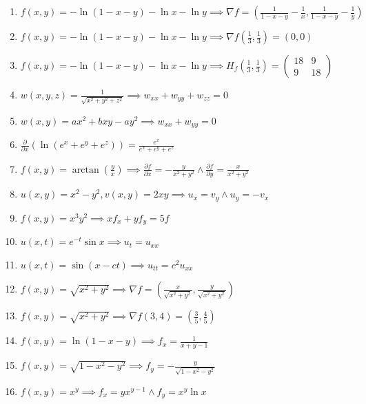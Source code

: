 \documentclass[11pt,a4paper]{article}
\begin{document}
\begin{enumerate}
\item $\displaystyle f(x, y) = -\ln(1 - x - y) - \ln x - \ln y \implies \nabla f = \left( \frac{1}{1 - x - y} - \frac{1}{x}, \frac{1}{1 - x - y} - \frac{1}{y} \right)$
\item $\displaystyle f(x, y) = -\ln(1 - x - y) - \ln x - \ln y \implies \nabla f\left( \frac{1}{3}, \frac{1}{3} \right) = (0, 0)$
\item $\displaystyle f(x, y) = -\ln(1 - x - y) - \ln x - \ln y \implies H_{f}\left( \frac{1}{3}, \frac{1}{3} \right) = \begin{pmatrix} 18 & 9 \\ 9 & 18 \end{pmatrix}$
\item $\displaystyle w(x, y, z) = \frac{1}{\sqrt{x^{2} + y^{2} + z^{2}}} \implies w_{xx} + w_{yy} + w_{zz} = 0$
\item $\displaystyle w(x, y) = ax^{2} + bxy - ay^{2} \implies w_{xx} + w_{yy} = 0$
\item $\displaystyle \frac{\partial}{\partial x}\left( \ln(e^{x} + e^{y} + e^{z}) \right) = \frac{e^{x}}{e^{x} + e^{y} + e^{z}}$
\item $\displaystyle f(x, y) = \arctan\left( \frac{y}{x} \right) \implies \frac{\partial f}{\partial x} = -\frac{y}{x^{2} + y^{2}} \land \frac{\partial f}{\partial y} = \frac{x}{x^{2} + y^{2}}$
\item $\displaystyle u(x, y) = x^{2} - y^{2}, v(x, y) = 2xy \implies u_{x} = v_{y} \land u_{y} = -v_{x}$
\item $\displaystyle f(x, y) = x^{3} y^{2} \implies x f_{x} + y f_{y} = 5f$
\item $\displaystyle u(x, t) = e^{-t} \sin x \implies u_{t} = u_{xx}$
\item $\displaystyle u(x, t) = \sin(x - ct) \implies u_{tt} = c^{2} u_{xx}$
\item $\displaystyle f(x, y) = \sqrt{x^{2} + y^{2}} \implies \nabla f = \left( \frac{x}{\sqrt{x^{2} + y^{2}}}, \frac{y}{\sqrt{x^{2} + y^{2}}} \right)$
\item $\displaystyle f(x, y) = \sqrt{x^{2} + y^{2}} \implies \nabla f(3, 4) = \left( \frac{3}{5}, \frac{4}{5} \right)$
\item $\displaystyle f(x, y) = \ln(1 - x - y) \implies f_{x} = \frac{1}{x + y - 1}$
\item $\displaystyle f(x, y) = \sqrt{1 - x^{2} - y^{2}} \implies f_{y} = -\frac{y}{\sqrt{1 - x^{2} - y^{2}}}$
\item $\displaystyle f(x, y) = x^{y} \implies f_{x} = y x^{y - 1} \land f_{y} = x^{y} \ln x$

\end{enumerate}
\end{document}
